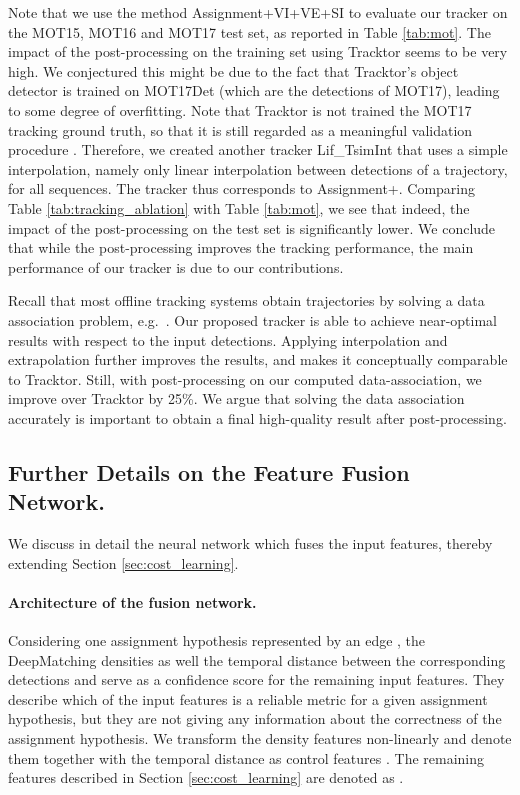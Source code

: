 \documentclass{article}
\begin{document}
Note that we use the method Assignment+VI+VE+SI to evaluate our tracker on the MOT15, MOT16 and MOT17 test set, as reported in Table \ref{tab:mot}. The impact of the post-processing on the training set using Tracktor seems to be very high. We conjectured this might be due to the fact that Tracktor's object detector is trained on MOT17Det (which are the detections of MOT17), leading to some degree of overfitting. Note that Tracktor is not trained the MOT17 tracking ground truth, so that it is still regarded as a meaningful validation procedure \cite{bergmann2019tracking}.
Therefore, we created another tracker Lif\_TsimInt that uses a simple interpolation, namely only linear interpolation between detections of a trajectory, for all sequences. The tracker thus corresponds to Assignment+.
Comparing Table \ref{tab:tracking_ablation} with Table \ref{tab:mot}, we see that indeed, the impact of the post-processing on the test set is significantly lower. We conclude that while the post-processing improves the tracking performance, the main performance of our tracker is due to our contributions. 


Recall that most offline tracking systems obtain trajectories by solving a data association problem, e.g.~\cite{Henschel_2018_CVPR_Workshops,tang2017multiple,ristani2018features}. Our proposed tracker is able to achieve near-optimal results with respect to the input detections. Applying interpolation and extrapolation further improves the results, and makes it conceptually comparable to Tracktor. 
Still, with post-processing on our computed data-association, we improve over Tracktor by 25\%. We argue that solving the data association accurately is important to obtain a final high-quality result after post-processing.





\subsection{Further Details on the Feature Fusion Network.}
\label{sec:fusion_network_details}
We discuss in detail the neural network which fuses the input features, thereby extending Section \ref{sec:cost_learning}. 
\paragraph{Architecture of the fusion network. } 
Considering one assignment hypothesis represented by an edge , the DeepMatching densities  as well the temporal distance  between the corresponding detections  and  serve as a confidence score for the remaining input features.  
They describe which of the input features is a reliable metric for a given assignment hypothesis, but they are not giving any information about the correctness of the assignment hypothesis. We transform the density features non-linearly and denote them together with the temporal distance as control features . The remaining features described in Section \ref{sec:cost_learning} are denoted as  .
\end{document}
